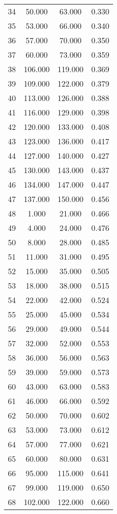 \begin{tabular}{cccc}
  34 & 50.000 & 63.000 & 0.330 \\ 
  35 & 53.000 & 66.000 & 0.340 \\ 
  36 & 57.000 & 70.000 & 0.350 \\ 
  37 & 60.000 & 73.000 & 0.359 \\ 
  38 & 106.000 & 119.000 & 0.369 \\ 
  39 & 109.000 & 122.000 & 0.379 \\ 
  40 & 113.000 & 126.000 & 0.388 \\ 
  41 & 116.000 & 129.000 & 0.398 \\ 
  42 & 120.000 & 133.000 & 0.408 \\ 
  43 & 123.000 & 136.000 & 0.417 \\ 
  44 & 127.000 & 140.000 & 0.427 \\ 
  45 & 130.000 & 143.000 & 0.437 \\ 
  46 & 134.000 & 147.000 & 0.447 \\ 
  47 & 137.000 & 150.000 & 0.456 \\ 
  48 & 1.000 & 21.000 & 0.466 \\ 
  49 & 4.000 & 24.000 & 0.476 \\ 
  50 & 8.000 & 28.000 & 0.485 \\ 
  51 & 11.000 & 31.000 & 0.495 \\ 
  52 & 15.000 & 35.000 & 0.505 \\ 
  53 & 18.000 & 38.000 & 0.515 \\ 
  54 & 22.000 & 42.000 & 0.524 \\ 
  55 & 25.000 & 45.000 & 0.534 \\ 
  56 & 29.000 & 49.000 & 0.544 \\ 
  57 & 32.000 & 52.000 & 0.553 \\ 
  58 & 36.000 & 56.000 & 0.563 \\ 
  59 & 39.000 & 59.000 & 0.573 \\ 
  60 & 43.000 & 63.000 & 0.583 \\ 
  61 & 46.000 & 66.000 & 0.592 \\ 
  62 & 50.000 & 70.000 & 0.602 \\ 
  63 & 53.000 & 73.000 & 0.612 \\ 
  64 & 57.000 & 77.000 & 0.621 \\ 
  65 & 60.000 & 80.000 & 0.631 \\ 
  66 & 95.000 & 115.000 & 0.641 \\ 
  67 & 99.000 & 119.000 & 0.650 \\ 
  68 & 102.000 & 122.000 & 0.660 \\ 

\end{tabular}
